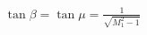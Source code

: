 \documentclass[10pt]{article}
\begin{document}
\begin{align*}\tan \beta 
= \tan \mu
= \frac{1}{ \sqrt{M_{1}^{2}-1}}\end{align*}
\end{document}
